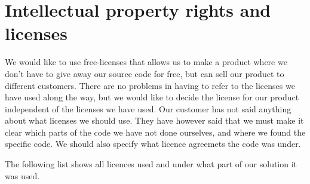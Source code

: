 
\section{Intellectual property rights and  licenses}
We would like to use free-licenses that allows us to make a product where we don’t have to give away our source code for free, but can sell our product to different customers. There are no problems in having to refer to the licenses we have used along the way, but we would like to decide the license for our product independent of the licenses we have used. 
\newline
\newline
Our customer has not said anything about what licenses we should use. They have however said that we must make it clear which parts of the code we have not done ourselves, and where we found the specific code. We should also specify what licence agreemets the code was under. 

\newpage
The following list shows all licences used and under what part of our solution it was used.

